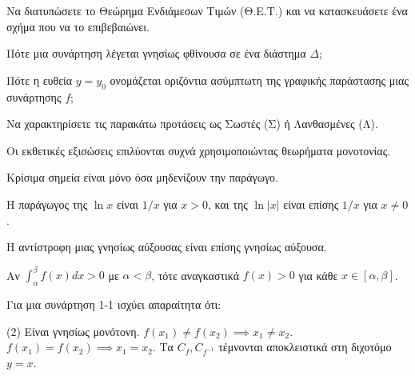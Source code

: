 \documentclass[11pt,a4paper]{article}
\newcommand{\kerkissans}[1]{{\fontfamily{maksf}\selectfont \textbf{#1}}}
\renewcommand{\textdexiakeraia}{}
\newcommand{\dint}{\displaystyle\int}
\newcommand\themanum{A}
\newcounter{thema}[section]
\renewcommand{\thethema}{\arabic{thema}}
\newcommand{\Thema}{\refstepcounter{thema}{\textbf{\textcolor{black}{\faPenSquare\ \  \large \kerkissans{\textbf{\thethemaο\hspace{2mm}Διαγώνισμα - Θέμα \themanum}}}}}\hspace{0mm}}{}
\newenvironment{thema}[1]
{\begin{tcolorbox}[title=\Thema\kerkissans{\textbf{\large{  #1}}},breakable,
enhanced standard,titlerule=0pt,toprule=0pt, rightrule=0pt, bottomrule=0pt,
colback=white,left=0mm,top=1mm,bottom=0mm,
boxrule=0pt,
colframe=white,leftrule=0mm,sharp corners,coltitle=black]
\renewcommand{\themanum}{#1}}
{\end{tcolorbox}}
\begin{document}
\begin{thema}{A}
\begin{erwthma}
    \item Να διατυπώσετε το Θεώρημα Ενδιάμεσων Τιμών (Θ.Ε.Τ.) και να κατασκευάσετε ένα σχήμα που να το επιβεβαιώνει.
    \item Πότε μια συνάρτηση λέγεται γνησίως φθίνουσα σε ένα διάστημα $\Delta$;
    \item Πότε η ευθεία $y=y_0$ ονομάζεται οριζόντια ασύμπτωτη της γραφικής παράστασης μιας συνάρτησης $f$;
    \item Να χαρακτηρίσετε τις παρακάτω προτάσεις ως Σωστές (Σ) ή Λανθασμένες (Λ).
    \begin{alist}
        \item Οι εκθετικές εξισώσεις επιλύονται συχνά χρησιμοποιώντας θεωρήματα μονοτονίας.
        \item Κρίσιμα σημεία είναι μόνο όσα μηδενίζουν την παράγωγο.
        \item Η παράγωγος της $\ln x$ είναι $1/x$ για $x>0$, και της $\ln |x|$ είναι επίσης $1/x$ για $x \ne 0$.
        \item H αντίστροφη μιας γνησίως αύξουσας είναι επίσης γνησίως αύξουσα.
        \item Αν $\dint_\alpha^\beta f(x)dx > 0$ με $\alpha < \beta$, τότε αναγκαστικά $f(x) > 0$ για κάθε $x \in [\alpha, \beta]$.
    \end{alist}
    \item Για μια συνάρτηση 1-1 ισχύει απαραίτητα ότι:
    \begin{tasks}[label=\let\textdexiakeraia\relax\alph*.](2)
        \task Είναι γνησίως μονότονη.
        \task $f(x_1) \ne f(x_2) \implies x_1 \ne x_2$.
        \task $f(x_1) = f(x_2) \implies x_1 = x_2$.
        \task Tα $C_f, C_{f^{-1}}$ τέμνονται αποκλειστικά στη διχοτόμο $y=x$.
    \end{tasks}
\end{erwthma}
\end{thema}
\vspace{1cm}
\end{document}
